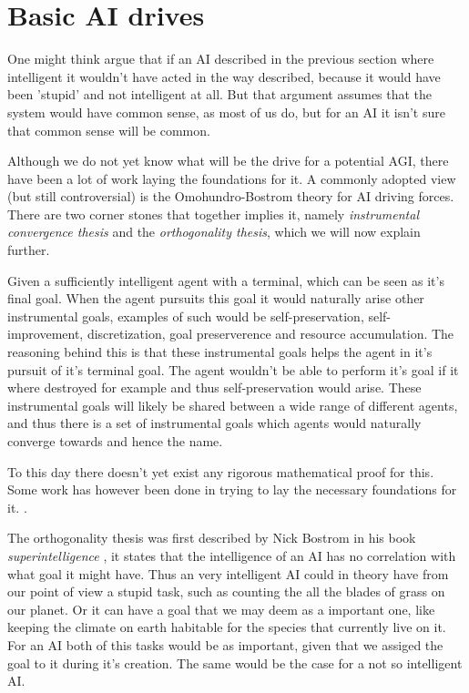\documentclass[12pt,A4]{report}
\theoremstyle{definition}
\begin{document}
\section{Basic AI drives}
One might think argue that if an AI described in the previous section where intelligent it wouldn't have acted in the way described, because it would have been 'stupid' and not intelligent at all. But that argument assumes that the system would have common sense, as most of us do, but for an AI it isn't sure that common sense will be common. 

Although we do not yet know what will be the drive for a potential AGI, there have been a lot of work laying the foundations for it. A commonly adopted view (but still controversial) is the Omohundro-Bostrom theory for AI driving forces. There are two corner stones that together implies it, namely \textit{instrumental convergence thesis} and the \textit{orthogonality thesis}, which we will now explain further.

Given a sufficiently intelligent agent with a terminal, which can be seen as it's final goal. When the agent pursuits this goal it would naturally arise other instrumental goals, examples of such would be self-preservation, self-improvement, discretization, goal preserverence and resource accumulation. The reasoning behind this is that these instrumental goals helps the agent in it's pursuit of it's terminal goal. The agent wouldn't be able to perform it's goal if it where destroyed for example and thus self-preservation would arise. These instrumental goals will likely be shared between a wide range of different agents, and thus there is a set of instrumental goals which agents would naturally converge towards and hence the name. 

To this day there doesn't yet exist any rigorous mathematical proof for this. Some work has however been done in trying to lay the necessary foundations for it. \autocite{TURNER et al}.  

The orthogonality thesis was first described by Nick Bostrom in his book \textit{superintelligence} \cite{Bostrom}, it states that the intelligence of an AI has no correlation with what goal it might have. Thus an very intelligent AI could in theory have from our point of view a stupid task, such as counting the all the blades of grass on our planet. Or it can have a goal that we may deem as a important one, like keeping the climate on earth habitable for the species that currently live on it. For an AI both of this tasks would be as important, given that we assiged the goal to it during it's creation. The same would be the case for a not so intelligent AI.
\end{document}
